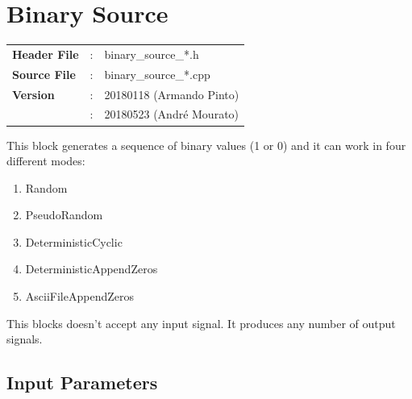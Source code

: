 \clearpage

\section{Binary Source}

\begin{tcolorbox}	
	\begin{tabular}{p{2.75cm} p{0.2cm} p{10.5cm}} 	
		\textbf{Header File}   &:& binary\_source\_*.h \\
		\textbf{Source File}   &:& binary\_source\_*.cpp \\
        \textbf{Version}       &:& 20180118 (Armando Pinto)\\
                               &:& 20180523 (Andr\'e Mourato)
	\end{tabular}
\end{tcolorbox}

\maketitle
This block generates a sequence of binary values (1 or 0) and it can work in four different modes:

\begin{multicols}{3}
\begin{enumerate}
	\item Random
	\item PseudoRandom
	\item DeterministicCyclic
	\item DeterministicAppendZeros
    \item AsciiFileAppendZeros
\end{enumerate}
\end{multicols}

This blocks doesn't accept any input signal. It produces any number of output signals.

\subsection*{Input Parameters}


